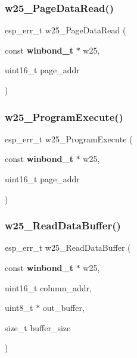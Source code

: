 \mbox{\label{_w25_n01_g_v_8h_ac7dd63e607cb0f3bea196f63fcae3f96}} 
\subsubsection{w25\+\_\+\+Page\+Data\+Read()}
{\footnotesize\ttfamily esp\+\_\+err\+\_\+t w25\+\_\+\+Page\+Data\+Read (\begin{DoxyParamCaption}\item[{const \textbf{ winbond\+\_\+t} $\ast$}]{w25,  }\item[{uint16\+\_\+t}]{page\+\_\+addr }\end{DoxyParamCaption})}

\mbox{\label{_w25_n01_g_v_8h_a62248c340a28ba708b9f9d482eddf63a}} 
\subsubsection{w25\+\_\+\+Program\+Execute()}
{\footnotesize\ttfamily esp\+\_\+err\+\_\+t w25\+\_\+\+Program\+Execute (\begin{DoxyParamCaption}\item[{const \textbf{ winbond\+\_\+t} $\ast$}]{w25,  }\item[{uint16\+\_\+t}]{page\+\_\+addr }\end{DoxyParamCaption})}

\mbox{\label{_w25_n01_g_v_8h_a84a181d8280eb384471aa3788b1c145f}} 
\subsubsection{w25\+\_\+\+Read\+Data\+Buffer()}
{\footnotesize\ttfamily esp\+\_\+err\+\_\+t w25\+\_\+\+Read\+Data\+Buffer (\begin{DoxyParamCaption}\item[{const \textbf{ winbond\+\_\+t} $\ast$}]{w25,  }\item[{uint16\+\_\+t}]{column\+\_\+addr,  }\item[{uint8\+\_\+t $\ast$}]{out\+\_\+buffer,  }\item[{size\+\_\+t}]{buffer\+\_\+size }\end{DoxyParamCaption})}

